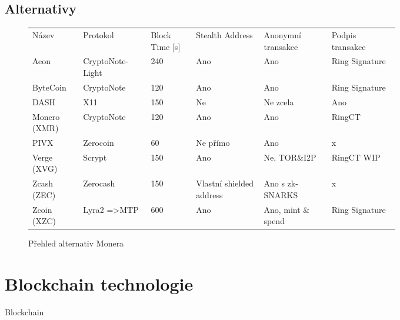 \documentclass[
  printed, %
  table,   %
  nolof,     %
  nolot,     %
           oneside, color
]{fithesis3}
\begin{document}
\subsection{Alternativy}
\begin{figure}[H]
\center
\begin{tabular}{p{0.1\linewidth}p{0.15\linewidth}p{0.1\linewidth}p{0.15\linewidth}p{0.15\linewidth}p{0.15\linewidth}}
Název        & Protokol                & Block Time {[}s{]} & Stealth Address          & Anonymní transakce & Podpis transakce  \\
Aeon         & CryptoNote-Light        & 240                & Ano                      & Ano                & Ring Signature \\
ByteCoin     & CryptoNote              & 120                & Ano                      & Ano                & Ring Signature \\
DASH         & X11                     & 150                & Ne                       & Ne zcela           & Ano            \\
Monero (XMR) & CryptoNote              & 120                & Ano                      & Ano                & RingCT         \\
PIVX         & Zerocoin                & 60                 & Ne přímo                 & Ano                & x              \\
Verge (XVG)  & Scrypt                  & 150                & Ano                      & Ne, TOR\&I2P       & RingCT WIP     \\
Zcash (ZEC)  & Zerocash                & 150                & Vlastní shielded address & Ano s zk-SNARKS    & x              \\
Zcoin (XZC)  & Lyra2 =\textgreater MTP & 600                & Ano                      & Ano, mint \& spend   & Ring Signature

\end{tabular}
\caption{Přehled alternativ Monera}
\label{monero-alternatives}
\end{figure}
\section{Blockchain technologie}
Blockchain
\end{document}
